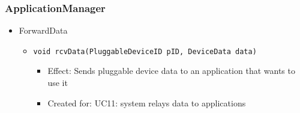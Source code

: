     \subsubsection{ApplicationManager}
        \begin{itemize}
            \item ForwardData
            \begin{itemize}
                \item \texttt{void rcvData(PluggableDeviceID pID, DeviceData data)}
                \begin{itemize}
                    \item Effect: Sends pluggable device data to an application that wants to use it
                    \item Created for: UC11: system relays data to applications
                \end{itemize}
            \end{itemize}
        \end{itemize}

